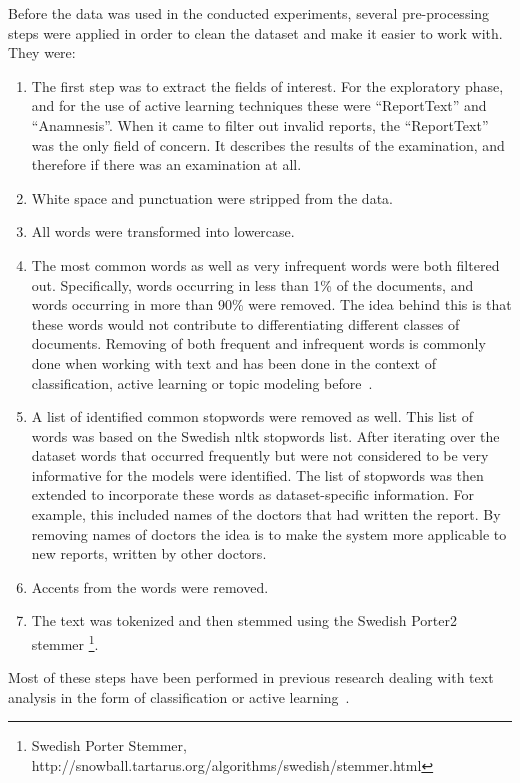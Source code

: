 Before the data was used in the conducted experiments, several pre-processing steps were applied in order to clean the dataset and make it easier to work with.
They were:
\begin{enumerate}
    \item The first step was to extract the fields of interest.
          For the exploratory phase, and for the use of active learning techniques these were ``ReportText'' and ``Anamnesis''.
          When it came to filter out invalid reports, the ``ReportText'' was the only field of concern.
          It describes the results of the examination, and therefore if there was an examination at all.
    \item White space and punctuation were stripped from the data.
    \item All words were transformed into lowercase.
    \item The most common words as well as very infrequent words were both filtered out.
          Specifically, words occurring in less than 1\% of the documents, and words occurring in more than 90\% were removed.
          The idea behind this is that these words would not contribute to differentiating different classes of documents.
          Removing of both frequent and infrequent words is commonly done when working with text and has been done in the context of classification, active learning or topic modeling before~\cite{tong2001support, blei2003latent, brinker2006active, sarioglu2013topic}.
    \item A list of identified common stopwords were removed as well.
          This list of words was based on the Swedish nltk stopwords list.
          After iterating over the dataset words that occurred frequently but were not considered to be very informative for the models were identified.
          The list of stopwords was then extended to incorporate these words as dataset-specific information.
          For example, this included names of the doctors that had written the report.
          By removing names of doctors the idea is to make the system more applicable to new reports, written by other doctors.
    \item Accents from the words were removed.
    \item The text was tokenized and then stemmed using the Swedish Porter2 stemmer \footnote{Swedish Porter Stemmer, http://snowball.tartarus.org/algorithms/swedish/stemmer.html}.
\end{enumerate}
Most of these steps have been performed in previous research  dealing with text analysis in the form of classification or active learning~\cite{tong2001support, blei2003latent, brinker2006active, sarioglu2013topic}.


